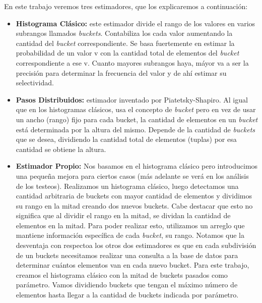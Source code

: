 \quad En este trabajo veremos tres estimadores, que los explicaremos a continuaci\'on:

\begin{itemize}
\item \textbf{Histograma Cl\'asico: } este estimador divide el rango de los valores en varios subrangos llamados \textit{buckets}. Contabiliza los cada valor aumentando la cantidad del \textit{bucket} correspondiente. Se basa fuertemente en estimar la probabilidad de un valor v con la cantidad total de elementos del \textit{bucket} correspondiente a ese v. Cuanto mayores subrangos haya, m\'ayor va a ser la precisi\'on para determinar la frecuencia del valor y de ah\'i estimar su selectividad. \\

\item \textbf{Pasos Distribuidos: } estimador inventado por Piatetsky-Shapiro. Al igual que en los histogramas cl\'asicos, usa el concepto de \textit{bucket} pero en vez de usar un ancho (rango) fijo para cada bucket, la cantidad de elementos en un \textit{bucket} est\'a determinada por la altura del mismo. Depende de la cantidad de \textit{buckets} que se desea, dividiendo la cantidad total de elementos (tuplas) por esa cantidad se obtiene la altura.\\

\item \textbf{Estimador Propio: } Nos basamos en el histograma cl\'asico pero introducimos una peque\~na mejora para ciertos casos (m\'as adelante se ver\'a en los an\'alisis de los testeos). Realizamos un histograma cl\'asico, luego detectamos una cantidad arbitraria de buckets con mayor cantidad de elementos y dividimos su rango en la mitad creando dos nuevos buckets. Cabe destacar que esto no significa que al dividir el rango en la mitad, se dividan la cantidad de elementos en la mitad. Para poder realizar esto, utilizamos un arreglo que mantiene informaci\'on espec\'ifica de cada \textit{bucket}, su rango. Notamos que la desventaja con respectoa  los otros dos estimadores es que en cada subdivisi\'on de un buckets necesitamos realizar una consulta a la base de datos para determinar cu\'antos elementos van en cada nuevo bucket. Para este trabajo, creamos el histograma cl\'asico con la mitad de buckets pasados como par\'ametro. Vamos dividiendo buckets que tengan el m\'aximo n\'umero de elementos hasta llegar a la cantidad de buckets indicada por par\'ametro.

\end{itemize}